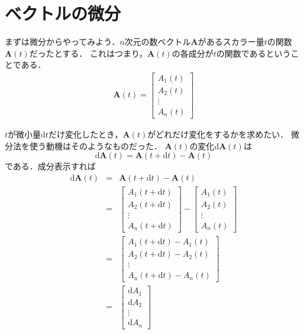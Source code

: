 \section{ベクトルの微分}
まずは微分からやってみよう．$n$次元の数ベクトル$\bm{A}$があるスカラー量$t$の関数$\bm{A}(t)$だったとする．
これはつまり，$\bm{A}(t)$の各成分が$t$の関数であるということである．
\begin{eqnarray}
\bm{A}(t) = \left[
\begin{array}{c}
 A_1 (t) \\
 A_2 (t) \\
 \vdots \\
 A_n (t)
 \end{array}
\right]
\label{eq:vect}
\end{eqnarray}

$t$が微小量$\mathrm{d}t$だけ変化したとき，$\bm{A}(t)$がどれだけ変化をするかを求めたい．
微分法を使う動機はそのようなものだった．
$\bm{A}(t)$の変化$\mathrm{d} \bm{A}(t)$は
$$
\mathrm{d} \bm{A}(t) = \bm{A} (t+ \mathrm{d} t) - \bm{A} (t)
$$
である．成分表示すれば
\begin{eqnarray*}
\mathrm{d} \bm{A}(t) & = &\bm{A} (t+ \mathrm{d} t) - \bm{A} (t) \\
& = & \left[
\begin{array}{c}
A_1 (t+ \mathrm{d} t) \\
A_2 (t+ \mathrm{d} t) \\
\vdots \\
A_n (t+ \mathrm{d} t) 
\end{array}
\right]
- 
\left[
\begin{array}{c}
 A_1 (t) \\
 A_2 (t) \\
 \vdots \\
 A_n (t)
 \end{array}
\right] \\
& = &  
 \left[
\begin{array}{c}
A_1 (t+ \mathrm{d} t) - A_1 (t)\\
A_2 (t+ \mathrm{d} t) - A_2(t) \\
\vdots \\
A_n (t+ \mathrm{d} t) - A_n (t)
\end{array}
\right] \\
& = & \left[
\begin{array}{c}
 \mathrm{d} A_1 \\
 \mathrm{d} A_2 \\
 \vdots \\
 \mathrm{d} A_n
 \end{array}
\right]
\end{eqnarray*}
